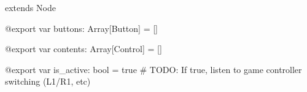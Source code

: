 extends Node

@export var buttons: Array[Button] = []

@export var contents: Array[Control] = []

@export var is_active: bool = true # TODO: If true, listen to game controller switching (L1/R1, etc)

